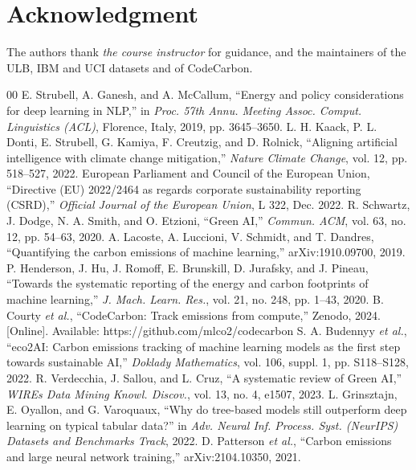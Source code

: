 \documentclass[conference]{IEEEtran}
\begin{document}
\section*{Acknowledgment}
The authors thank \emph{the course instructor} for guidance, and the maintainers of the ULB, IBM and UCI datasets and of
CodeCarbon.

\begin{thebibliography}{00}
 E. Strubell, A. Ganesh, and A. McCallum, ``Energy and policy considerations for deep learning in NLP,'' in \emph{Proc. 57th Annu. Meeting Assoc. Comput. Linguistics (ACL)}, Florence, Italy, 2019, pp. 3645--3650.
 L. H. Kaack, P. L. Donti, E. Strubell, G. Kamiya, F. Creutzig, and D. Rolnick, ``Aligning artificial intelligence with climate change mitigation,'' \emph{Nature Climate Change}, vol. 12, pp. 518--527, 2022.
 European Parliament and Council of the European Union, ``Directive (EU) 2022/2464 as regards corporate sustainability reporting (CSRD),'' \emph{Official Journal of the European Union}, L 322, Dec. 2022.
 R. Schwartz, J. Dodge, N. A. Smith, and O. Etzioni, ``Green AI,'' \emph{Commun. ACM}, vol. 63, no. 12, pp. 54--63, 2020.
 A. Lacoste, A. Luccioni, V. Schmidt, and T. Dandres, ``Quantifying the carbon emissions of machine learning,'' arXiv:1910.09700, 2019.
 P. Henderson, J. Hu, J. Romoff, E. Brunskill, D. Jurafsky, and J. Pineau, ``Towards the systematic reporting of the energy and carbon footprints of machine learning,'' \emph{J. Mach. Learn. Res.}, vol. 21, no. 248, pp. 1--43, 2020.
 B. Courty \emph{et al.}, ``CodeCarbon: Track emissions from compute,'' Zenodo, 2024. [Online]. Available: https://github.com/mlco2/codecarbon
 S. A. Budennyy \emph{et al.}, ``eco2AI: Carbon emissions tracking of machine learning models as the first step towards sustainable AI,'' \emph{Doklady Mathematics}, vol. 106, suppl. 1, pp. S118--S128, 2022.
 R. Verdecchia, J. Sallou, and L. Cruz, ``A systematic review of Green AI,'' \emph{WIREs Data Mining Knowl. Discov.}, vol. 13, no. 4, e1507, 2023.
 L. Grinsztajn, E. Oyallon, and G. Varoquaux, ``Why do tree-based models still outperform deep learning on typical tabular data?'' in \emph{Adv. Neural Inf. Process. Syst. (NeurIPS) Datasets and Benchmarks Track}, 2022.
 D. Patterson \emph{et al.}, ``Carbon emissions and large neural network training,'' arXiv:2104.10350, 2021.

\end{thebibliography}
\end{document}
